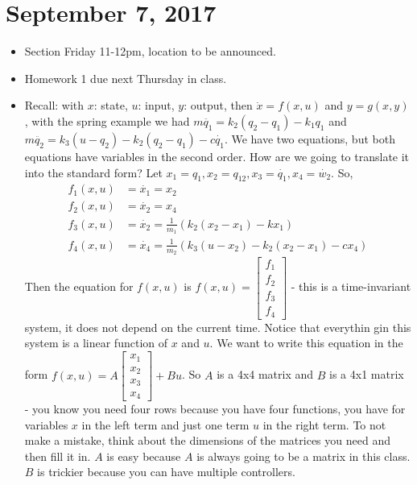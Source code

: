 \documentclass[12pt]{article}
\theoremstyle{definition}
\begin{document}
\section{September 7, 2017}
\begin{itemize}
    \itemsep0em 
    \item Section Friday 11-12pm, location to be announced.
    \item Homework 1 due next Thursday in class.
    \item Recall: with $x$: state, $u$: input, $y$: output, then $\dot{x} = f(x, u)$ and $y = g(x, y)$, with the spring example we had $m\ddot{q_1} = k_2(q_2 - q_1) - k_1q_1$ and $m\ddot{q_2} = k_3(u - q_2) - k_2(q_2 - q_1) - c\dot{q_1}$. We have two equations, but both equations have variables in the second order. How are we going to translate it into the standard form? Let $x_1 = q_1, x_2 = q_12, x_3 = \dot{q_1}, x_4 = \dot{w_2}$. So,
    \begin{align*}
        f_1(x, u) &= \dot{x_1} = x_2 \\
        f_2(x, u) &= \dot{x_2} = x_4 \\
        f_3(x, u) &= \dot{x_2} = \frac{1}{m_1}(k_2(x_2 - x_1) - kx_1) \\
        f_4(x, u) &= \dot{x_4} = \frac{1}{m_2}(k_3(u - x_2) - k_2(x_2 - x_1) - cx_4)
    \end{align*}
    Then the equation for $f(x, u)$ is $f(x, u) = \begin{bmatrix} f_1 \\ f_2 \\ f_3 \\ f_4 \end{bmatrix}$ - this is a time-invariant system, it does not depend on the current time. Notice that everythin gin this system is a linear function of $x$ and $u$. We want to write this equation in the form $f(x, u) = A\begin{bmatrix} x_1 \\ x_2 \\ x_3 \\ x_4 \end{bmatrix} + Bu$. So $A$ is a 4x4 matrix and $B$ is a 4x1 matrix - you know you need four rows because you have four functions, you have for variables $x$ in the left term and just one term $u$ in the right term. To not make a mistake, think about the dimensions of the matrices you need and then fill it in. $A$ is easy because $A$ is always going to be a matrix in this class. $B$ is trickier because you can have multiple controllers.

\end{itemize}
\end{document}
